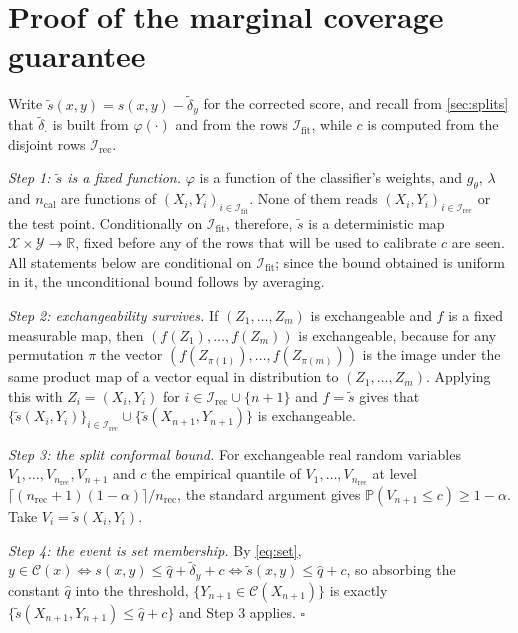 \appendix
\section{Proof of the marginal coverage guarantee}
\label{app:proof}

Write $\tilde s(x,y)=s(x,y)-\tilde\delta_y$ for the corrected score, and recall from
\cref{sec:splits} that $\tilde\delta_\cdot$ is built from $\varphi(\cdot)$ and from the rows
$\mathcal{I}_{\mathrm{fit}}$, while $c$ is computed from the disjoint rows
$\mathcal{I}_{\mathrm{rec}}$.

\emph{Step 1: $\tilde s$ is a fixed function.} $\varphi$ is a function of the classifier's
weights, and $g_\theta$, $\lambda$ and $n_{\mathrm{cal}}$ are functions of
$(X_i,Y_i)_{i\in\mathcal{I}_{\mathrm{fit}}}$. None of them reads
$(X_i,Y_i)_{i\in\mathcal{I}_{\mathrm{rec}}}$ or the test point. Conditionally on
$\mathcal{I}_{\mathrm{fit}}$, therefore, $\tilde s$ is a deterministic map
$\mathcal{X}\times\mathcal{Y}\to\mathbb{R}$, fixed before any of the rows that will be used to
calibrate $c$ are seen. All statements below are conditional on
$\mathcal{I}_{\mathrm{fit}}$; since the bound obtained is uniform in it, the unconditional
bound follows by averaging.

\emph{Step 2: exchangeability survives.} If $(Z_1,\dots,Z_m)$ is exchangeable and $f$ is a
fixed measurable map, then $(f(Z_1),\dots,f(Z_m))$ is exchangeable, because for any permutation
$\pi$ the vector $(f(Z_{\pi(1)}),\dots,f(Z_{\pi(m)}))$ is the image under the same product map
of a vector equal in distribution to $(Z_1,\dots,Z_m)$. Applying this with
$Z_i=(X_i,Y_i)$ for $i\in\mathcal{I}_{\mathrm{rec}}\cup\{n+1\}$ and $f=\tilde s$ gives that
$\{\tilde s(X_i,Y_i)\}_{i\in\mathcal{I}_{\mathrm{rec}}}\cup\{\tilde s(X_{n+1},Y_{n+1})\}$ is
exchangeable.

\emph{Step 3: the split conformal bound.} For exchangeable real random variables
$V_1,\dots,V_{n_{\mathrm{rec}}},V_{n+1}$ and $c$ the empirical quantile of
$V_1,\dots,V_{n_{\mathrm{rec}}}$ at level
$\lceil (n_{\mathrm{rec}}+1)(1-\alpha)\rceil/n_{\mathrm{rec}}$, the standard argument
\cite{vovk2005algorithmic,angelopoulos2023gentle} gives
$\mathbb{P}(V_{n+1}\le c)\ge 1-\alpha$. Take $V_i=\tilde s(X_i,Y_i)$.

\emph{Step 4: the event is set membership.} By \cref{eq:set},
$y\in\mathcal{C}(x)\iff s(x,y)\le\hat q+\tilde\delta_y+c\iff\tilde s(x,y)\le \hat q+c$, so
absorbing the constant $\hat q$ into the threshold, $\{Y_{n+1}\in\mathcal{C}(X_{n+1})\}$ is
exactly $\{\tilde s(X_{n+1},Y_{n+1})\le \hat q + c\}$ and Step 3 applies. $\square$

